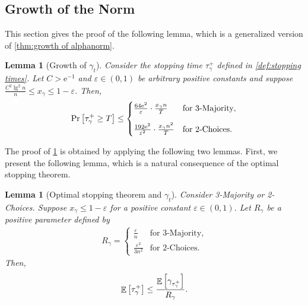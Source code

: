 \documentclass[letterpaper,11pt]{article}
\newtheorem{lemma}[theorem]{Lemma}
\DeclareMathOperator*{\E}{\mathbb{E}}
\renewcommand{\epsilon}{\varepsilon}
\newcommand{\e}{\mathrm{e}}
\newcommand{\alphanorm}{\gamma}
\newcommand{\taunormdown}{\tau^{\downarrow}_\alphanorm}
\newcommand{\taunormplus}{\tau^{+}_{\alphanorm}}
\newcommand{\drift}{R}
\newcommand{\tauivanish}{\tau^{\mathrm{vanish}}_i}
\newcommand{\tauiactive}{\tau^{\mathrm{active}}_i}
\newcommand{\xnorm}{x_{\alphanorm}}
\newcommand{\driftnorm}{\drift_{\alphanorm}}
\begin{document}
\subsection{Growth of the Norm} \label{sec:growth of norm}
This section gives the proof of the following lemma, which is a generalized version of \cref{thm:growth of alphanorm}.
%
\begin{lemma}[Growth of $ \alphanorm_t $] \label{lem:taunormplus}
  Consider the stopping time $ \taunormplus $ defined in \cref{def:stopping times}.
  Let $C>\mathrm{e}^{-1}$ and $\epsilon\in(0,1)$ be arbitrary positive constants and suppose $\frac{C^2\lg^2n}{n}\leq \xnorm\leq 1-\varepsilon$.
  Then,
  \begin{align*} 
     \Pr\qty[ \taunormplus \ge T ] \le 
     \begin{cases}
      \frac{64\e^2}{\epsilon}\cdot  \frac{\xnorm n}{T}	& \text{for 3-Majority},\\[10pt]
      \frac{192\e^2}{\epsilon^2}\cdot  \frac{\xnorm n^2}{T}	& \text{for 2-Choices}.
     \end{cases}
  \end{align*}
\end{lemma}
The proof of \cref{lem:taunormplus} is obtained by applying the following two lemmas.
First, we present the following lemma, which is a natural consequence of the optimal stopping theorem.
\begin{lemma}[Optimal stopping theorem and $\alphanorm_t$]
    \label{lem:taunormplus OST}
    Consider 3-Majority or 2-Choices.
    Suppose $\xnorm\leq 1-\varepsilon$ for a positive constant $\varepsilon\in (0,1)$.
Let $\driftnorm$ be a positive parameter defined by
\begin{align*}
    \driftnorm=
    \begin{cases*}
        \frac{\varepsilon}{n} & \text{for 3-Majority},\\
        \frac{\varepsilon^2}{3n^2} & \text{for 2-Choices}.
    \end{cases*}
\end{align*}
Then, 
\begin{align*}
    \E\qty[\taunormplus]
    \leq \frac{\E\qty[\alphanorm_{\taunormplus}]}{\driftnorm}.
\end{align*}
\end{lemma}
\end{document}
